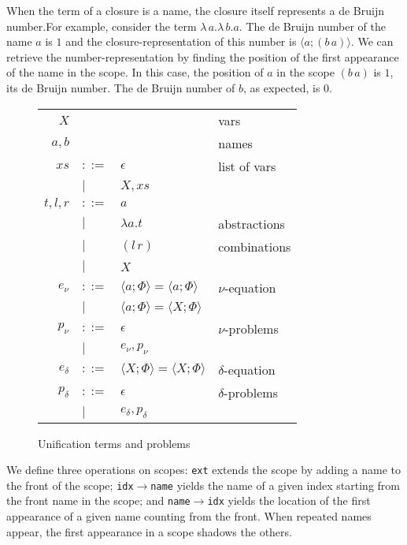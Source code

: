 \documentclass[a4paper,UKenglish]{lipics-v2016}
\newcommand{\clos}[2] {
\langle #1; #2 \rangle
}
\newcommand{\app}[2] {
(#1\, #2)
}
\begin{document}
When the term of a closure is a name, the closure itself represents a
de Bruijn number.For example, consider the term
$\lambda\,a.\lambda\,b.a$. The de Bruijn number of the name $a$ is $1$
and the closure-representation of this number is $\clos{a}{(b\,a)}$.
We can retrieve the number-representation by finding the position of
the first appearance of the name in the scope. In this case, the
position of $a$ in the scope $(b\,a)$ is $1$, its de Bruijn
number. The de Bruijn number of $b$, as expected, is $0$.

\begin{wrapfigure}{r}{0.5\textwidth}
\caption{Unification terms and problems\label{table:new-terms}}
\begin{tabular}{r l l l}
$X$ & & & vars \\
$a,b$ & & & names \\
$xs$ & $::=$ & $\epsilon$& list of vars \\
& $|$&$X,xs$ &\\
$t,l,r$ & $::=$ & $a$ & \\
& $|$ & $\lambda a.t$ & abstractions \\
& $|$ & $\app{l}{r}$ & combinations \\
& $|$ & $X$ & \\
$e_\nu$& $::=$ & $\clos{a}{\Phi} = \clos{a}{\Phi}$ & $\nu$-equation \\
 & $|$ &$\clos{a}{\Phi} = \clos{X}{\Phi}$ \\
$p_\nu$& $::=$ & $\epsilon$ & $\nu$-problems \\
 & $|$ & $e_\nu, p_\nu$ \\
$e_\delta$& $::=$& $\clos{X}{\Phi} = \clos{X}{\Phi}$ & $\delta$-equation \\
$p_\delta$& $::=$ & $\epsilon$ & $\delta$-problems \\
 & $|$ & $e_\delta, p_\delta$
\end{tabular}
\end{wrapfigure}

We define three operations on scopes: \texttt{ext}
extends the scope by adding a name to the front of the scope;
\texttt{idx$\rightarrow$name} yields the name of a given index
starting from the front name in the scope; and
\texttt{name$\rightarrow$idx} yields the location of the first
appearance of a given name counting from the front.
When repeated names appear, the
first appearance in a scope shadows the others.
\end{document}
